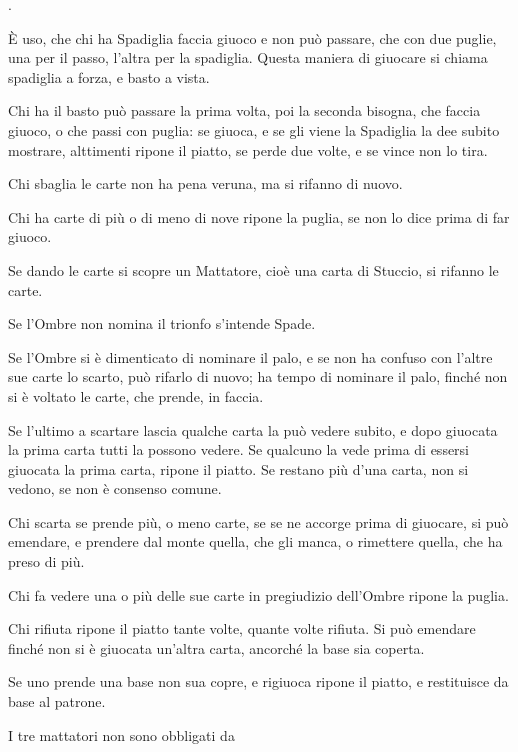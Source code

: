 \documentclass[11pt,a6paper]{article}
\newcounter{listombrecnt}
\begin{document}
\begin{list}
{.}
{
\setlength{\labelwidth}{1.5pt}
\setlength{\labelsep}{1.0em}
\setlength{\itemsep}{-0.3em}
\setlength{\leftmargin}{0em}
\setlength{\itemindent}{2.5em} %
}
\item È uso, che chi ha Spadiglia faccia giuoco
e non può passare, che con due
puglie, una per il passo, l'altra per la spadiglia.
Questa maniera di giuocare si chiama
spadiglia a forza, e basto a vista.
\item Chi ha il basto può passare la prima
volta, poi la seconda bisogna, che faccia
giuoco, o che passi con puglia: se giuoca, e
se gli viene la Spadiglia la dee subito mostrare,
alttimenti ripone il piatto, se perde
due volte, e se vince non lo tira.
\item Chi sbaglia le carte non ha pena veruna, ma si rifanno di nuovo.
\item Chi ha carte di più o di meno di nove
ripone la puglia, se non lo dice prima di far
giuoco.
\item Se dando le carte si scopre un Mattatore,
 cioè una carta di Stuccio, si rifanno le carte.
\item Se l'Ombre non nomina il trionfo s'intende Spade.
\item Se l'Ombre si è dimenticato di nominare
 il palo, e se non ha confuso con l'altre
sue carte lo scarto, può rifarlo di nuovo; ha
tempo di nominare il palo, finché non si è
voltato le carte, che prende, in faccia.
\item Se l'ultimo a scartare lascia qualche
carta la può vedere subito, e dopo giuocata
la prima carta tutti la possono vedere. Se
qualcuno la vede prima di essersi giuocata la
prima carta, ripone il piatto. Se restano più
d'una carta, non si vedono, se non è consenso comune.
\item Chi scarta se prende più, o meno carte,
 se se ne accorge prima di giuocare, si può
emendare, e prendere dal monte quella,
che gli manca, o rimettere quella, che ha
preso di più.
\item Chi fa vedere una o più delle sue
carte in pregiudizio dell'Ombre ripone la
puglia.
\item Chi rifiuta ripone il piatto tante volte,
 quante volte rifiuta. Si può emendare finché
 non si è giuocata un'altra carta, ancorché
 la base sia coperta.
\item Se uno prende una base non sua copre,
 e rigiuoca ripone il piatto, e restituisce
 da base al patrone.
\item I tre mattatori non sono obbligati da

\end{list}
\end{document}

